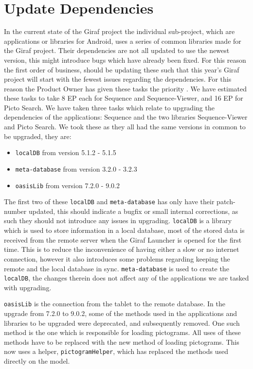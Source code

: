 \section{Update Dependencies} 
In the current state of the Giraf project the individual sub-project, which are applications or libraries for Android, uses a series of common libraries made for the Giraf project. 
Their dependencies are not all updated to use the newest version, this might introduce bugs which have already been fixed. 
For this reason the first order of business, should be updating these such that this year's Giraf project will start with the fewest issues regarding the dependencies. 
For this reason the Product Owner has given these tasks the priority \phigh. 
We have estimated these tasks to take 8 EP each for Sequence and Sequence-Viewer, and 16 EP for Picto Search. 
We have taken three tasks which relate to upgrading the dependencies of the applications: Sequence and the two libraries Sequence-Viewer and Picto Search. 
We took these as they all had the same versions in common to be upgraded, they are: 
\begin{itemize} 
    \item \texttt{localDB} from version 5.1.2 - 5.1.5 
    \item \texttt{meta-database} from version 3.2.0 - 3.2.3 
    \item \texttt{oasisLib} from version 7.2.0 - 9.0.2 
\end{itemize} 
The first two of these \texttt{localDB} and \texttt{meta-database} has only have their patch-number updated, this should indicate a bugfix or small internal corrections, as such they should not introduce any issues in upgrading. 
\texttt{localDB} is a library which is used to store information in a local database, most of the stored data is received from the remote server when the Giraf Launcher is opened for the first time. 
This is to reduce the inconvenience of having either a slow or no internet connection, however it also introduces some problems regarding keeping the remote and the local database in sync. 
\texttt{meta-database} is used to create the \texttt{localDB}, the changes therein does not affect any of the applications we are tasked with upgrading. 
  
\texttt{oasisLib} is the connection from the tablet to the remote database. 
In the upgrade from 7.2.0 to 9.0.2, some of the methods used in the applications and libraries to be upgraded were deprecated, and subsequently removed. 
One such method is the one which is responsible for loading pictograms. 
All uses of these methods have to be replaced with the new method of loading pictograms. 
This now uses a helper, \texttt{pictogramHelper}, which has replaced the methods used directly on the model. 
  
